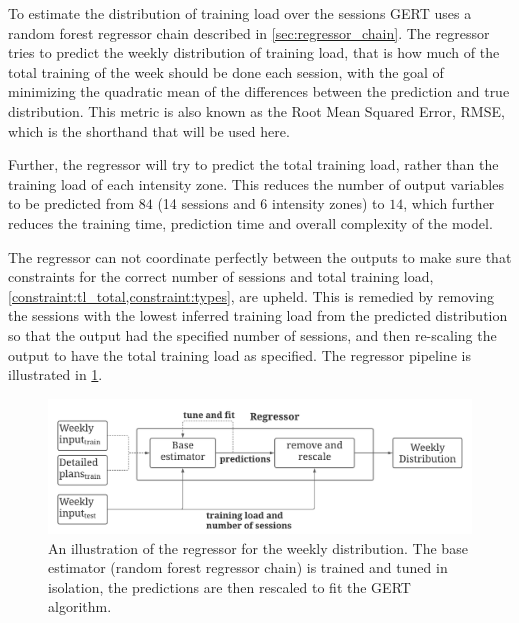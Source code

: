 To estimate the distribution of training load over the sessions GERT uses a random forest regressor chain described in \ref{sec:regressor_chain}.
The regressor tries to predict the weekly distribution of training load, that is how much of the total training of the week should be done each session, with the goal of minimizing the quadratic mean of the differences between the prediction and true distribution.
This metric is also known as the Root Mean Squared Error, RMSE, which is the shorthand that will be used here.

Further, the regressor will try to predict the total training load, rather than the training load of each intensity zone. 
This reduces the number of output variables to be predicted from $84$ (14 sessions and 6 intensity zones) to $14$, which further reduces the training time, prediction time and overall complexity of the model.

The regressor can not coordinate perfectly between the outputs to make sure that constraints for the correct number of sessions and total training load, \cref{constraint:tl_total,constraint:types}, are upheld.
This is remedied by removing the sessions with the lowest inferred training load from the predicted distribution so that the output had the specified number of sessions, and then re-scaling the output to have the total training load as specified.
The regressor pipeline is illustrated in \cref{fig:regressor_illustration}.

\begin{figure}
    \centering
    \includegraphics[width=0.8\linewidth]{chapters/figures/implementation_plots/regressor_illustration.pdf}
    \caption{An illustration of the regressor for the weekly distribution.
    The base estimator (random forest regressor chain) is trained and tuned in isolation, the predictions are then rescaled to fit the GERT algorithm. }
    \label{fig:regressor_illustration}
\end{figure}


